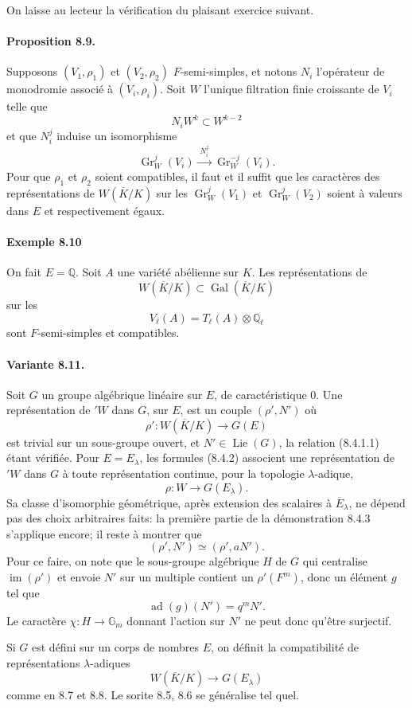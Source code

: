 \documentclass[10pt]{article}
\newcommand{\Q}{\mathbb Q}
\newcommand{\Gal}{\operatorname{Gal}}
\providecommand{\im}{\operatorname{im}}
\providecommand{\Gal}{\operatorname{Gal}}
\providecommand{\im}{\operatorname{im}}
\providecommand{\Lie}{\operatorname{Lie}}
\providecommand{\Lie}{\operatorname{Lie}}
\providecommand{\im}{\operatorname{im}}
\providecommand{\ad}{\operatorname{ad}}
\providecommand{\Gr}{\operatorname{Gr}}
\providecommand{\Gal}{\operatorname{Gal}}
\providecommand{\Gal}{\operatorname{Gal}}
\providecommand{\Gal}{\operatorname{Gal}}
\begin{document}
On laisse au lecteur la vérification du plaisant exercice suivant.

\paragraph{Proposition 8.9.} Supposons $(V_1,\rho_1)$ et $(V_2,\rho_2)$ $F$-semi-simples, et notons $N_i$ l'opérateur de monodromie associé à $(V_i,\rho_i)$. Soit $W$ l'unique filtration finie croissante de $V_i$ telle que
\[
N_i W^k\subset W^{k-2}
\]
et que $N_i^j$ induise un isomorphisme
\[
\Gr_W^j(V_i)\xrightarrow{\;N_i^j\;}\Gr_W^{-j}(V_i).
\]
Pour que $\rho_1$ et $\rho_2$ soient compatibles, il faut et il suffit que les caractères des représentations de $W(\overline K/K)$ sur les $\Gr_W^j(V_1)$ et $\Gr_W^j(V_2)$ soient à valeurs dans $E$ et respectivement égaux.

\paragraph{Exemple 8.10} On fait $E=\Q$. Soit $A$ une variété abélienne sur $K$. Les représentations de
\[
W(\overline K/K)\subset \Gal(\overline K/K)
\]
sur les
\[
V_\ell(A)=T_\ell(A)\otimes\Q_\ell
\]
sont $F$-semi-simples et compatibles.

\paragraph{Variante 8.11.} Soit $G$ un groupe algébrique linéaire sur $E$, de caractéristique $0$. Une représentation de ${}'W$ dans $G$, sur $E$, est un couple $(\rho',N')$ où
\[
\rho':W(\overline K/K)\longrightarrow G(E)
\]
est trivial sur un sous-groupe ouvert, et $N'\in\Lie(G)$, la relation (8.4.1.1) étant vérifiée. Pour $E=E_\lambda$, les formules (8.4.2) associent une représentation de ${}'W$ dans $G$ à toute représentation continue, pour la topologie $\lambda$-adique,
\[
\rho:W\longrightarrow G(E_\lambda).
\]
Sa classe d'isomorphie géométrique, après extension des scalaires à $\overline E_\lambda$, ne dépend pas des choix arbitraires faits: la première partie de la démonstration 8.4.3 s'applique encore; il reste à montrer que
\[
(\rho',N')\simeq(\rho',aN').
\]
Pour ce faire, on note que le sous-groupe algébrique $H$ de $G$ qui centralise $\im(\rho')$ et envoie $N'$ sur un multiple contient un $\rho'(F^m)$, donc un élément $g$ tel que
\[
\ad(g)(N')=q^mN'.
\]
Le caractère $\chi:H\to\mathbb G_m$ donnant l'action sur $N'$ ne peut donc qu'être surjectif.

Si $G$ est défini sur un corps de nombres $E$, on définit la compatibilité de représentations $\lambda$-adiques
\[
W(\overline K/K)\longrightarrow G(E_\lambda)
\]
comme en 8.7 et 8.8. Le sorite 8.5, 8.6 se généralise tel quel.
\end{document}
